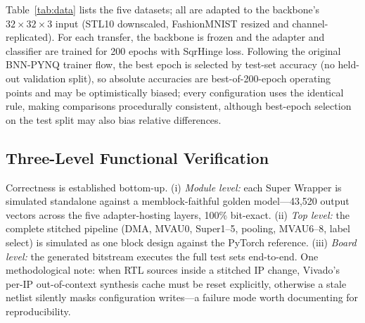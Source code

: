 \documentclass[journal]{IEEEtran}
\begin{document}
Table~\ref{tab:data} lists the five datasets; all are adapted to the backbone's $32{\times}32{\times}3$ input (STL10 downscaled, FashionMNIST resized and channel-replicated). For each transfer, the backbone is frozen and the adapter and classifier are trained for 200 epochs with SqrHinge loss. Following the original BNN-PYNQ trainer flow, the best epoch is selected by test-set accuracy (no held-out validation split), so absolute accuracies are best-of-200-epoch operating points and may be optimistically biased; every configuration uses the identical rule, making comparisons procedurally consistent, although best-epoch selection on the test split may also bias relative differences.

\begin{table}[!t]
\centering
\caption{Datasets (all adapted to a $32{\times}32{\times}3$ input).}
\label{tab:data}
\small
\setlength{\tabcolsep}{3.5pt}
\end{table}

\subsection{Three-Level Functional Verification}
Correctness is established bottom-up. (i) \emph{Module level:} each Super Wrapper is simulated standalone against a memblock-faithful golden model---43{,}520 output vectors across the five adapter-hosting layers, 100\% bit-exact. (ii) \emph{Top level:} the complete stitched pipeline (DMA, MVAU0, Super1--5, pooling, MVAU6--8, label select) is simulated as one block design against the PyTorch reference. (iii) \emph{Board level:} the generated bitstream executes the full test sets end-to-end. One methodological note: when RTL sources inside a stitched IP change, Vivado's per-IP out-of-context synthesis cache must be reset explicitly, otherwise a stale netlist silently masks configuration writes---a failure mode worth documenting for reproducibility.
\end{document}
